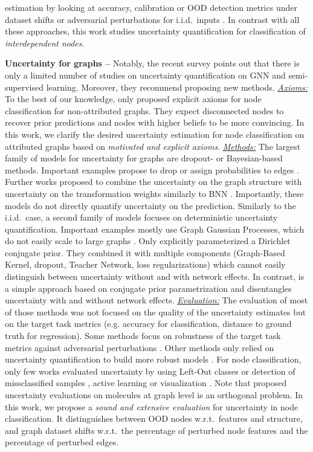 estimation by looking at accuracy, calibration or OOD detection metrics under dataset shifts or adversarial perturbations for i.i.d.\ inputs \citep{Ovadia2019, robustness-uncertainty-dirichlet}. In contrast with all these approaches, this work studies uncertainty quantification for classification of \emph{interdependent nodes}.

\textbf{Uncertainty for graphs -- } Notably, the recent survey \citep{Abdar2020} points out that there is only a limited number of studies on uncertainty quantification on GNN and semi-supervised learning. Moreover, they recommend proposing new methods. \emph{\underline{Axioms:}} To the best of our knowledge, only \citep{Eswaran2017} proposed explicit axioms for node classification for non-attributed graphs. They expect disconnected nodes to recover prior predictions and nodes with higher beliefs to be more convincing. In this work, we clarify the desired uncertainty estimation for node classification on attributed graphs based on \emph{motivated and explicit axioms}. \emph{\underline{Methods:}} The largest family of models for uncertainty for graphs are dropout- or Bayesian-based methods. Important examples propose to drop or assign probabilities to edges \citep{Rong2019, Chen2018, Hasanzadeh2020, Dallachiesa2014, Hu2017}. Further works proposed to combine the uncertainty on the graph structure with uncertainty on the transformation weights similarly to BNN \citep{Elinas2019, Zhang2019b, Pal2019a, Pal2019b}. Importantly, these models do not directly quantify uncertainty on the prediction. Similarly to the i.i.d.\ case, a second family of models focuses on deterministic uncertainty quantification. Important examples mostly use Graph Gaussian Processes, which do not easily scale to large graphs \citep{Ng2018, Zhi2020, Liu2020c, Borovitskiy2020}. Only \citep{Zhao2020} explicitly parameterized a Dirichlet conjugate prior. They combined it with multiple components (Graph-Based Kernel, dropout, Teacher Network, loss regularizations) which cannot easily distinguish between uncertainty without and with network effects. In contrast, \oursacro{} is a simple approach based on conjugate prior parametrization and disentangles uncertainty with and without network effects. \emph{\underline{Evaluation:}} The evaluation of most of those methods was not focused on the quality of the uncertainty estimates but on the target task metrics (e.g. accuracy for classification, distance to ground truth for regression). Some methods focus on robustness of the target task metrics against adversarial perturbations \citep{GNNBook-ch8-gunnemann, zugner2018adversarial, zugner2019adversarial}. Other methods only relied on uncertainty quantification to build more robust models \citep{Zhu2019, Feng2020}. For node classification, only few works evaluated uncertainty by using Left-Out classes or detection of missclassified samples \citep{Zhao2020}, active learning \cite{Ng2018} or visualization \citep{Borovitskiy2020}. Note that proposed uncertainty evaluations on molecules at graph level \citep{Zhang2019, Ryu2019, Akita2018, uncertainty-nn-molecules, uncertainty-material-prediction} is an orthogonal problem. In this work, we propose a \emph{sound and extensive evaluation} for uncertainty in node classification. It distinguishes between OOD nodes w.r.t.\ features and structure, and graph dataset shifts w.r.t.\ the percentage of perturbed node features and the percentage of perturbed edges.
